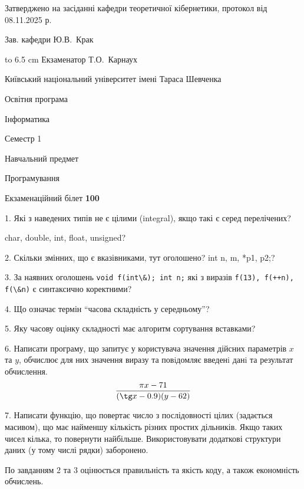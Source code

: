 \documentclass[12pt, ukrainian]{article}
\def\code#1{\Verb!#1!}
\begin{document}
{\smallskip\smallskip \begin {scriptsize} Затверджено на засіданні кафедри теоретичної кібернетики, протокол   від   08.11.2025 р.\par\smallskip\smallskip\smallskip\smallskip
{\parbox {6.5 cm} {Зав. кафедри \dotfill Ю.В.~Крак}}\hspace {0.7cm} {\hbox to 6.5 cm { Екзаменатор \dotfill Т.О.~Карнаух}} \end{scriptsize}}
\vspace{0.9cm}
{{\begin {scriptsize}\par
{ \center  Київський національний університет імені Тараса Шевченка \par}
{\parbox {5 cm}{Освітня програма \hfill}{\parbox {7 cm}{Інформатика\hfill}}\parbox {6 cm}{\hfill Семестр 1}}\par
{\parbox {5 cm} {Навчальний предмет \hfill}\parbox {7 cm}{Програмування \hfill}\parbox {6cm}{\hfill}\par}\vspace{-15pt} \end{scriptsize}}{\center Екзаменаційний білет \No \textbf { 100 }\par}}
{%
1. Які з наведених типів не є цілими (integral), якщо такі є серед перелічених?

char, double, int, float, unsigned?
\par
\vspace{2mm}
2. Скільки змінних, що є вказівниками, тут оголошено?
int n, m, *p1, p2;?
\par
\vspace{2mm}
3. За наявних оголошень \code{void f(int\&); int n;} які з виразів \code{f(13), f(++n), f(\&n)} є синтаксично коректними?
\par
\vspace{2mm}
4. Що означає термін ``часова складність у середньому''?
\par
\vspace{2mm}
5. Яку часову оцінку складності має алгоритм сортування вставками?
\par
\vspace{2mm}
6. Написати програму, що запитує у користувача значення дійсних параметрів $x$ та $y$, обчислює для них значення виразу та повiдомляє введенi данi та результат обчислення.
$$\frac{\pi x - 71}{(\tg x - 0.9) (y - 62)}$$ 

\par
7. Написати функцію, що повертає число з послідовності цілих (задається масивом), що має найменшу кількість різних простих дільників. Якщо таких чисел кілька, то повернути найбільше. Використовувати додаткові структури даних (у тому числі рядки) заборонено.

По завданням 2 та 3 оцінюється правильність та якість коду, а також економність обчислень.

}
\end{document}

